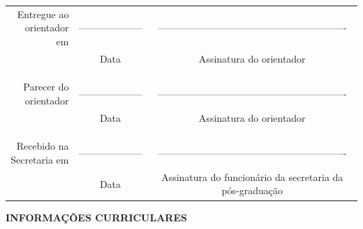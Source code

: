 \documentclass[12pt,a4paper,final]{report}%
\begin{document}
\hspace{60cm}

\hspace{60cm}

\hspace{60cm}

\hspace{60cm}

\hspace{60cm}



\begin{table}[h]
\centering
\begin{tabular}{rcc}
 
Entregue ao orientador em &--------------------& ----------------------------------------------------------\\ 
                      
 & Data       & Assinatura do orientador\\
 &  &  \\
 &  &  \\
 &  &  \\
Parecer do orientador &--------------------& ----------------------------------------------------------\\
 & Data       & Assinatura do orientador\\
 &  &  \\
 &  &  \\
 &  &  \\
 Recebido na Secretaria em &--------------------& ----------------------------------------------------------\\
 & Data &Assinatura do funcionário da secretaria da pós-graduação \\
 
\end{tabular}
\end{table}

\pagebreak%

\begin{center}
\textbf{INFORMAÇÕES CURRICULARES}
\end{center}

\hspace{60cm}
\end{document}

